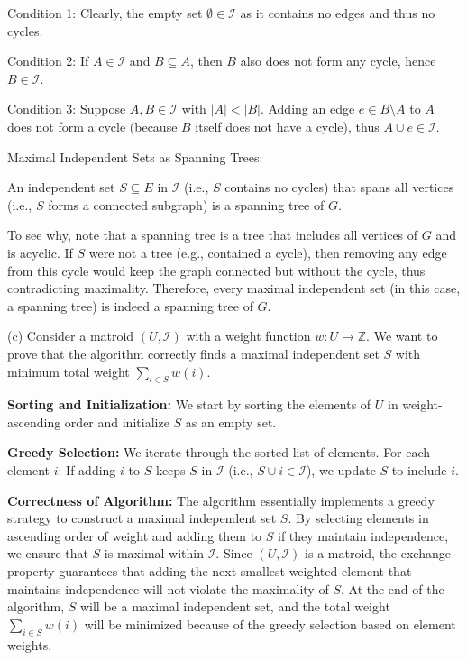 \documentclass{oxmathproblems}
\begin{document}
\begin{questions}
Condition 1: Clearly, the empty set $\emptyset \in \mathcal{I}$ as it contains no edges and thus no cycles.

Condition 2: If $A \in \mathcal{I}$ and $B \subseteq A$, then $B$ also does not form any cycle, hence $B \in \mathcal{I}$.

Condition 3: Suppose $A, B \in \mathcal{I}$ with $|A| < |B|$. Adding an edge $e \in B \setminus A$ to $A$ does not form a cycle (because $B$ itself does not have a cycle), thus $A \cup {e} \in \mathcal{I}$.

Maximal Independent Sets as Spanning Trees:

An independent set $S \subseteq E$ in $\mathcal{I}$ (i.e., $S$ contains no cycles) that spans all vertices (i.e., $S$ forms a connected subgraph) is a spanning tree of $G$.

To see why, note that a spanning tree is a tree that includes all vertices of $G$ and is acyclic. If $S$ were not a tree (e.g., contained a cycle), then removing any edge from this cycle would keep the graph connected but without the cycle, thus contradicting maximality. Therefore, every maximal independent set (in this case, a spanning tree) is indeed a spanning tree of $G$.

(c)
Consider a matroid $(U, \mathcal{I})$ with a weight function $w: U \to \mathbb{Z}$. We want to prove that the algorithm correctly finds a maximal independent set $S$ with minimum total weight $\sum_{i \in S} w(i)$.

\textbf{Sorting and Initialization:}
We start by sorting the elements of $U$ in weight-ascending order and initialize $S$ as an empty set.

\textbf{Greedy Selection:}
We iterate through the sorted list of elements. For each element $i$:
If adding $i$ to $S$ keeps $S$ in $\mathcal{I}$ (i.e., $S \cup {i} \in \mathcal{I}$), we update $S$ to include $i$.

\textbf{Correctness of Algorithm:}
The algorithm essentially implements a greedy strategy to construct a maximal independent set $S$. By selecting elements in ascending order of weight and adding them to $S$ if they maintain independence, we ensure that $S$ is maximal within $\mathcal{I}$.
Since $(U, \mathcal{I})$ is a matroid, the exchange property guarantees that adding the next smallest weighted element that maintains independence will not violate the maximality of $S$.
At the end of the algorithm, $S$ will be a maximal independent set, and the total weight $\sum_{i \in S} w(i)$ will be minimized because of the greedy selection based on element weights.


\end{questions}
\end{document}
